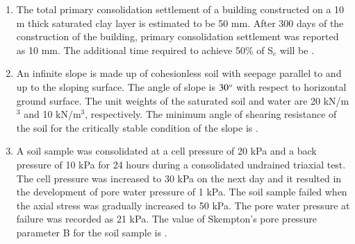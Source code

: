 \documentclass[journal,12pt,onecolumn]{article}
\theoremstyle{remark}
\begin{document}
\begin{enumerate}
    \hfill{}
    
    \item The total primary consolidation settlement  of a building constructed on a 10 m thick saturated clay layer is estimated to be 50 mm. After 300 days of the construction of the building, primary consolidation settlement was reported as 10 mm. The additional time  required to achieve 50\% of S$_c$ will be \underline{\hspace{2cm}} .
    
    \hfill{}
    
    \item An infinite slope is made up of cohesionless soil with seepage parallel to and up to the sloping surface. The angle of slope is $30\degree$ with respect to horizontal ground surface. The unit weights of the saturated soil and water are 20 kN/m$^3$ and 10 kN/m$^3$, respectively. The minimum angle of shearing resistance of the soil  for the critically stable condition of the slope is \underline{\hspace{2cm}} .
    
    \hfill{}
    
    \item A soil sample was consolidated at a cell pressure of 20 kPa and a back pressure of 10 kPa for 24 hours during a consolidated undrained  triaxial test. The cell pressure was increased to 30 kPa on the next day and it resulted in the development of pore water pressure of 1 kPa. The soil sample failed when the axial stress was gradually increased to 50 kPa. The pore water pressure at failure was recorded as 21 kPa. The value of Skempton's pore pressure parameter B for the soil sample is \underline{\hspace{2cm}} .
    
    \hfill{}
    

\end{enumerate}
\end{document}
